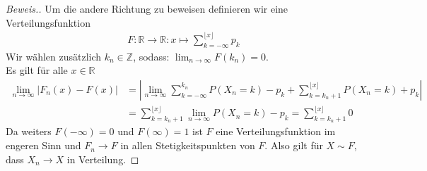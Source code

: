 \begin{proof}[Beweis.]
    Um die andere Richtung zu beweisen definieren wir eine Verteilungsfunktion
    \begin{align*}
        F:\mathbb{R}\to\mathbb{R}:x\mapsto\sum_{k=-\infty}^{\lfloor x\rfloor}p_k
    \end{align*}
    Wir wählen zusätzlich $k_n \in \mathbb{Z}$, sodass: $\lim_{n\to\infty}F(k_n) = 0$. \\
    Es gilt für alle $x\in\mathbb{R}$
    \begin{align*}
        \lim_{n\to\infty}| F_n(x) - F(x) | &=|\lim_{n\to\infty}\sum_{k=-\infty}^{k_n}P(X_n=k) - p_k + \sum_{k= k_n + 1}^{\lfloor x\rfloor}P(X_n=k) + p_k |\\
        &=\sum_{k= k_n + 1}^{\lfloor x\rfloor}\lim_{n\to\infty}P(X_n=k) - p_k = \sum_{k= k_n + 1}^{\lfloor x\rfloor}0
    \end{align*}
Da weiters $F(-\infty)=0$ und $F(\infty)=1$ ist $F$ eine Verteilungsfunktion im engeren Sinn und $F_n\to F$ in allen Stetigkeitspunkten von $F$. Also gilt für $X\sim F$, dass $X_n\to X$ in Verteilung.
\end{proof}

